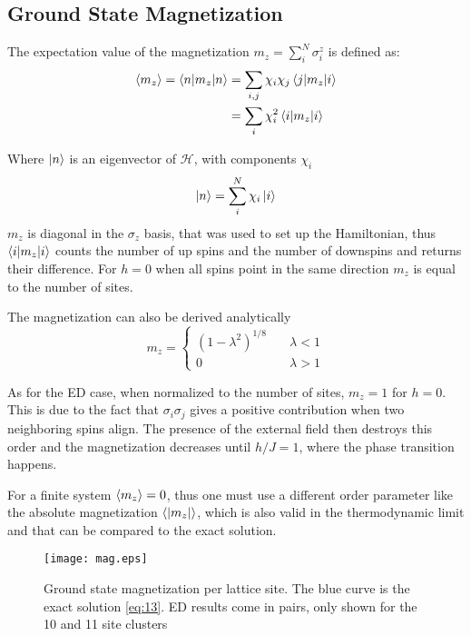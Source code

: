 \documentclass[a4paper,12pt]{article}
\begin{document}
\subsection{Ground State Magnetization}

The expectation value of the magnetization $m_z = \sum_i^N \sigma_i^z$
is defined as:
\begin{align}
\label{eq:32}
\braket{m_z} = \braket{n|m_z|n} &= \sum\limits_{i,j} \chi_i \chi_j 
                                  \braket{j|m_z|i}\\
&= \sum\limits_i \chi_i^2 \braket{i|m_z|i}
\end{align}

Where $\ket{n}$ is an eigenvector of $\mathcal{H}$, with components $\chi_i$
\begin{equation*}
\label{eq:33}
\ket{n} = \sum\limits_i^N \chi_i \ket{i}
\end{equation*}
$m_z$ is diagonal in the $\sigma_z$ basis, that was used to set up the
Hamiltonian, thus $\braket{i|m_z|i}$ counts the number of up spins and the number of
 downspins and returns their difference. For $h = 0$ when all spins
 point in the same direction $m_z$ is equal to the number of sites.

The magnetization can also be derived analytically \cite{Pfeuty} 
\begin{equation}
\label{eq:13}
m_z = 
\begin{cases} (1-\lambda^2)^{1/8} & \quad \lambda <1\\
0 & \quad \lambda >1
\end{cases}
\end{equation}

As for the ED case, when normalized to the number of sites, $m_z = 1$
for $h = 0$. This is due to the fact that $\sigma_i\sigma_j$ gives a
positive contribution when two neighboring spins align. The presence
of the external field then destroys this order and the magnetization
decreases until $h/J = 1$, where the phase transition happens.

For a finite system $\braket{m_z} = 0$, thus one must use a different
order parameter like the  absolute
magnetization $\braket{|m_z|}$, which is also valid in the
thermodynamic limit and that can be compared to the exact solution.

\begin{figure}[htbp]
\centerline{\texttt{[image: mag.eps]}}
\caption[]{\label{fig:mag} Ground state magnetization per lattice
  site. The blue curve is the exact solution \eqref{eq:13}. ED results
  come in pairs, only shown for the 10 and 11 site clusters}
\end{figure}
\end{document}
